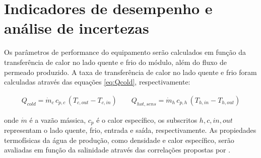 


\section{Indicadores de desempenho e análise de incertezas}

Os parâmetros de performance do equipamento serão calculados em função da transferência de calor no lado quente e frio do módulo, além do fluxo de permeado produzido. A taxa de transferência de calor no lado quente e frio foram calculadas através das equações \ref{eq:Qcold}, respectivamente: 

\vspace{-0.8cm}
\begin{subequations}
\renewcommand{\theequation}{\theparentequation\ (a,b)}
\begin{equation}
\begin{aligned}
Q_{cold}=\dot{m}_c\, c_{p,c}\,(T_{c,out}-T_{c,in})
\qquad
Q_{hot,sens}=\dot{m}_h\, c_{p,h}\,(T_{h,in}-T_{h,out})
\end{aligned}
\label{eq:Qcold}
\end{equation}
\end{subequations}
\vspace{-0.8cm}

onde $\dot m$ é a vazão mássica, $c_p$ é o calor específico, os subscritos $h, c, in, out$ representam o lado quente, frio, entrada e saída, respectivamente. As propiedades termofísicas da água de produção, como densidade e calor específico, serão avaliadas em função da salinidade através das correlações propostas por \cite{Millero1980}.

